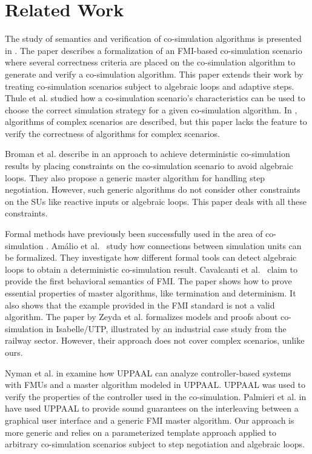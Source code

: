 \section{Related Work}\label{sc:related}
The study of semantics and verification of co-simulation algorithms is presented in \cite{Gomes2019c,Gomes2019a,Broman2013}. 
The paper \cite{Gomes2019c} describes a formalization of an FMI-based co-simulation scenario where several correctness criteria are placed on the co-simulation algorithm to generate and verify a co-simulation algorithm. 
This paper extends their work by treating co-simulation scenarios subject to algebraic loops and adaptive steps.
Thule et al. \cite{Thule_2018} studied how a co-simulation scenario's characteristics can be used to choose the correct simulation strategy for a given co-simulation algorithm. 
In \cite{thrane2021}, algorithms of complex scenarios are described, but this paper lacks the feature to verify the correctness of algorithms for complex scenarios.

Broman et al. describe in \cite{Broman2013} an approach to achieve deterministic co-simulation results by placing constraints on the co-simulation scenario to avoid algebraic loops. 
They also propose a generic master algorithm for handling step negotiation. 
However, such generic algorithms do not consider other constraints on the SUs like reactive inputs or algebraic loops. This paper deals with all these constraints.

Formal methods have previously been successfully used in the area of co-simulation \cite{Amalio2016,sampaio_behavioural_2016,cerone_formalising_2018}.
Amálio et al.\ \cite{Amalio2016} study how connections between simulation units can be formalized. They investigate how different formal tools can detect algebraic loops to obtain a deterministic co-simulation result. 
Cavalcanti et al.\ \cite{sampaio_behavioural_2016} claim to provide the first behavioral semantics of FMI. The paper shows how to prove essential properties of master algorithms, like termination and determinism. It also shows that the example provided in the FMI standard is not a valid algorithm. The paper \cite{cerone_formalising_2018} by Zeyda et al. formalizes models and proofs about co-simulation in Isabelle/UTP, illustrated by an industrial case study from the railway sector. 
However, their approach does not cover complex scenarios, unlike ours.

Nyman et al. in \cite{jensen_integrating_2017} examine how UPPAAL can analyze controller-based systems with FMUs and a master algorithm modeled in UPPAAL. UPPAAL was used to verify the properties of the controller used in the co-simulation. Palmieri et al. in \cite{palmieri2019framework} have used UPPAAL to provide sound guarantees on the interleaving between a graphical user interface and a generic FMI master algorithm. 
Our approach is more generic and relies on a parameterized template approach applied to arbitrary co-simulation scenarios subject to step negotiation and algebraic loops.

